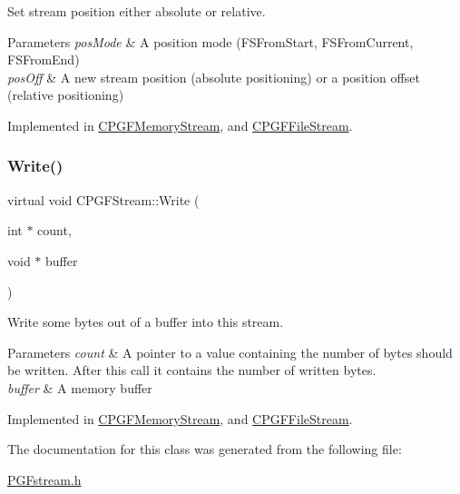 Set stream position either absolute or relative. 
\begin{DoxyParams}{Parameters}
{\em pos\+Mode} & A position mode (F\+S\+From\+Start, F\+S\+From\+Current, F\+S\+From\+End) \\
\hline
{\em pos\+Off} & A new stream position (absolute positioning) or a position offset (relative positioning) \\
\hline
\end{DoxyParams}


Implemented in \mbox{\hyperlink{classCPGFMemoryStream_a28e8defe72f535c49535c40ffe2ad299}{C\+P\+G\+F\+Memory\+Stream}}, and \mbox{\hyperlink{classCPGFFileStream_a2460f1fdab77a44ddf24420139a50043}{C\+P\+G\+F\+File\+Stream}}.

\mbox{\label{classCPGFStream_a0a46ae977995134787219288f4123134}} 
\subsubsection{\texorpdfstring{Write()}{Write()}}
{\footnotesize\ttfamily virtual void C\+P\+G\+F\+Stream\+::\+Write (\begin{DoxyParamCaption}\item[{int $\ast$}]{count,  }\item[{void $\ast$}]{buffer }\end{DoxyParamCaption})\hspace{0.3cm}{\ttfamily [pure virtual]}}

Write some bytes out of a buffer into this stream. 
\begin{DoxyParams}{Parameters}
{\em count} & A pointer to a value containing the number of bytes should be written. After this call it contains the number of written bytes. \\
\hline
{\em buffer} & A memory buffer \\
\hline
\end{DoxyParams}


Implemented in \mbox{\hyperlink{classCPGFMemoryStream_a627161d30d8d10fc306f50ea9c37f1a5}{C\+P\+G\+F\+Memory\+Stream}}, and \mbox{\hyperlink{classCPGFFileStream_a28a060662951edf72f7739ba575c9fff}{C\+P\+G\+F\+File\+Stream}}.



The documentation for this class was generated from the following file\+:\begin{DoxyCompactItemize}
\item 
\mbox{\hyperlink{PGFstream_8h}{P\+G\+Fstream.\+h}}\end{DoxyCompactItemize}
